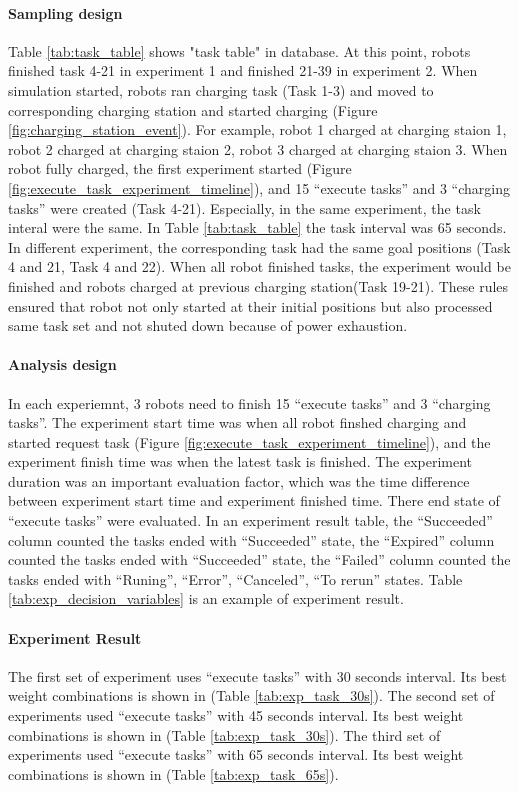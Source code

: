 \paragraph{Sampling design}
Table \ref{tab:task_table} shows "task table" in database. At this point, robots finished task 4-21 in experiment 1 and finished 21-39 in experiment 2. When simulation started, robots ran charging task (Task 1-3) and moved to corresponding charging station and started charging (Figure \ref{fig:charging_station_event}). For example, robot 1 charged at charging staion 1, robot 2 charged at charging staion 2, robot 3 charged at charging staion 3. 
    When robot fully charged, the first experiment started (Figure \ref{fig:execute_task_experiment_timeline}), and 15 ``execute tasks'' and 3 ``charging tasks'' were created (Task 4-21). Especially, in the same experiment, the task interal were the same. In Table \ref{tab:task_table} the task interval was 65 seconds. In different experiment, the corresponding task had the same goal positions (Task 4 and 21, Task 4 and 22). 
    When all robot finished tasks, the experiment would be finished and robots charged at previous charging station(Task 19-21).
    These rules ensured that robot not only started at their initial positions but also processed same task set and not shuted down because of power exhaustion.

\paragraph{Analysis design}
In each experiemnt, 3 robots need to finish 15 ``execute tasks'' and 3 ``charging tasks''.
The experiment start time was when all robot finshed charging and started request task (Figure \ref{fig:execute_task_experiment_timeline}), and the experiment finish time was when the latest task is finished.
The experiment duration was an important evaluation factor, which was the time difference between experiment start time and experiment finished time.  
There end state of ``execute tasks'' were evaluated. In an experiment result table, the ``Succeeded'' column counted the tasks ended with ``Succeeded'' state, the ``Expired'' column counted the tasks ended with ``Succeeded'' state, the ``Failed'' column counted the tasks ended with ``Runing'', ``Error'', ``Canceled'', ``To rerun'' states. 
Table \ref{tab:exp_decision_variables} is an example of experiment result. 

\paragraph{Experiment Result} 
The first set of experiment uses ``execute tasks'' with 30 seconds interval. Its best weight combinations is shown in (Table \ref{tab:exp_task_30s}).
The second set of experiments used ``execute tasks'' with 45 seconds interval. Its best weight combinations is shown in (Table \ref{tab:exp_task_30s}).
The third set of experiments used ``execute tasks'' with 65 seconds interval. Its best weight combinations is shown in (Table \ref{tab:exp_task_65s}).    

